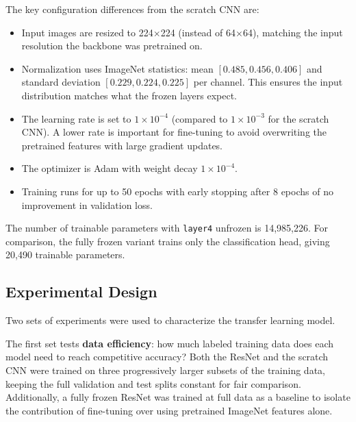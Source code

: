 The key configuration differences from the scratch CNN are:

\begin{itemize}
  \item Input images are resized to 224$\times$224 (instead of 64$\times$64), matching the
    input resolution the backbone was pretrained on.
  \item Normalization uses ImageNet statistics: mean $[0.485, 0.456, 0.406]$ and
    standard deviation $[0.229, 0.224, 0.225]$ per channel. This ensures the
    input distribution matches what the frozen layers expect.
  \item The learning rate is set to $1\times10^{-4}$ (compared to $1\times10^{-3}$
    for the scratch CNN). A lower rate is important for fine-tuning to avoid
    overwriting the pretrained features with large gradient updates.
  \item The optimizer is Adam with weight decay $1\times10^{-4}$.
  \item Training runs for up to 50 epochs with early stopping after 8 epochs
    of no improvement in validation loss.
\end{itemize}

The number of trainable parameters with \texttt{layer4} unfrozen is 14{,}985{,}226.
For comparison, the fully frozen variant trains only the classification head,
giving 20{,}490 trainable parameters.

\subsection{Experimental Design}
\label{sec:model2_experiments}

Two sets of experiments were used to characterize the transfer learning model.

The first set tests \textbf{data efficiency}: how much labeled training data does
each model need to reach competitive accuracy? Both the ResNet and the scratch CNN
were trained on three progressively larger subsets of the training data, keeping
the full validation and test splits constant for fair comparison. Additionally, a
fully frozen ResNet was trained at full data as a baseline to isolate the
contribution of fine-tuning over using pretrained ImageNet features alone.

